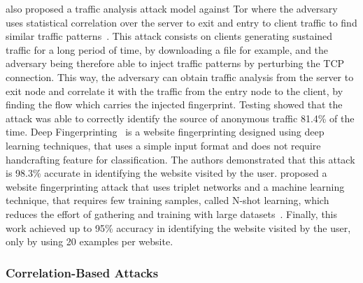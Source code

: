 \citeauthor{chakravarty2014trafficanalysis} also proposed a traffic analysis attack model against Tor where the adversary uses statistical correlation over the server to exit and entry to client traffic to find similar traffic patterns~\cite{chakravarty2014trafficanalysis}. This attack consists on clients generating sustained traffic for a long period of time, by downloading a file for example, and the adversary being therefore able to inject traffic patterns by perturbing the TCP connection. This way, the adversary can obtain traffic analysis from the server to exit node and correlate it with the traffic from the entry node to the client, by finding the flow which carries the injected fingerprint.
Testing showed that the attack was able to correctly identify the source of anonymous traffic 81.4\% of the time.
Deep Fingerprinting~\cite{DeepFingerprinting} is a website fingerprinting designed using deep learning techniques, that uses a simple input format and does not require handcrafting feature for classification. The authors demonstrated that this attack is 98.3\% accurate in identifying the website visited by the user.
\citeauthor{TripletFingerprinting} proposed a website fingerprinting attack that uses triplet networks and a machine learning technique, that requires few training samples, called N-shot learning, which reduces the effort of gathering and training with large datasets~\cite{TripletFingerprinting}. Finally, this work achieved up to 95\% accuracy in identifying the website visited by the user, only by using 20 examples per website.

\subsubsection{Correlation-Based Attacks}\label{subsubsec:correlation_based_attacks}

